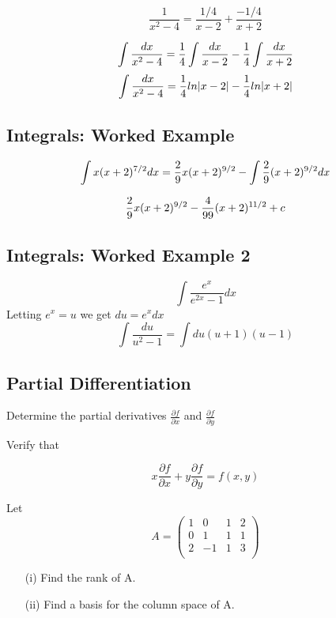 \documentclass[12pt, a4paper]{article}
\begin{document}
\[ \frac{1}{x^2-4} = \frac{1/4}{x-2} + \frac{-1/4}{x+2} \]

\[ \int \frac{dx}{x^2-4} = {1 \over 4}\int \frac{dx}{x-2} -{1 \over 4}\int \frac{dx}{x+2} \]
\[ \int \frac{dx}{x^2-4} = {1 \over 4}ln|x-2|-{1 \over 4}ln|x+2| \]


\newpage
\subsection*{Integrals: Worked Example}

\[ \int x(x+2)^{7/2}dx = {2 \over 9}x(x+2)^{9/2} - \int {2 \over 9}(x+2)^{9/2}dx\]

\[ {2 \over 9 }x (x+2)^{9/2} -  {4 \over 99}(x+2)^{11/2} + c \]


\newpage
\subsection{Integrals: Worked Example 2}
\[ \int \frac{e^x}{e^{2x}-1}dx  \]
Letting $e^x=u$ we get $du=e^x dx$
\[ \int \frac{du}{u^2-1} = \int {du}{(u+1)(u-1)}\]

\subsection{Partial Differentiation}



Determine the partial derivatives $\frac{\partial f}{\partial x } $
and $\frac{\partial f}{\partial y } $


Verify that

\[x\frac{\partial f}{\partial x } +  y\frac{\partial f}{\partial y }= f(x,y)\]


Let
\[A = \left(
\begin{array}{cccc}
1 &0 &1& 2\\
0 &1 &1 &1\\
2 &-1& 1 &3\\
\end{array}
\right)
\]
\begin{itemize}
\item[(i)] Find the rank of A.
\item[(ii)] Find a basis for the column space of A.
\end{itemize}
\end{document}
